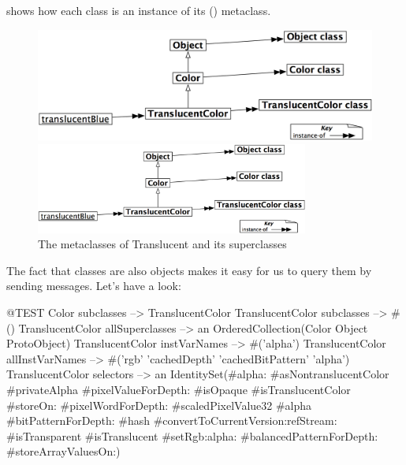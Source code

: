 \documentclass[a4paper,10pt,twoside]{book}
\begin{document}
\noindent
{} shows how each class is an instance of its () metaclass.

\begin{center}
\begin{figure}[!ht]
\ifluluelse
	{\centerline {\includegraphics[width=\textwidth]{TranslucentMetaclasses}}}
	{\centerline {\includegraphics[width=0.8\textwidth]{TranslucentMetaclasses}}}
\caption{The metaclasses of Translucent and its superclasses\label{fig:translucentmetaclasses}}
\end{figure}
\end{center}

The fact that classes are also objects makes it easy for us to query them by sending messages. Let's have a look:

\begin{code}{@TEST}
Color subclasses                           --> {TranslucentColor}
TranslucentColor subclasses         --> #()
TranslucentColor allSuperclasses  --> an OrderedCollection(Color Object ProtoObject)
TranslucentColor instVarNames     --> #('alpha')
TranslucentColor allInstVarNames --> #('rgb' 'cachedDepth' 'cachedBitPattern' 'alpha')
TranslucentColor selectors             --> an IdentitySet(#alpha: #asNontranslucentColor #privateAlpha #pixelValueForDepth: #isOpaque #isTranslucentColor #storeOn: #pixelWordForDepth: #scaledPixelValue32 #alpha #bitPatternForDepth: #hash #convertToCurrentVersion:refStream: #isTransparent #isTranslucent #setRgb:alpha: #balancedPatternForDepth: #storeArrayValuesOn:)
\end{code}
\end{document}
